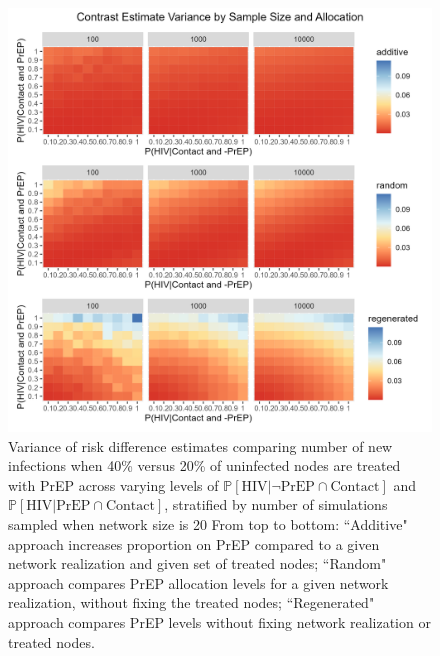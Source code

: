 \documentclass{article}
\theoremstyle{definition}
\begin{document}
\begin{figure}[H]
    \centering
    \includegraphics[width=\linewidth]{Figures/Sample Size Variance plots.png}
    \caption{Variance of risk difference estimates comparing number of new infections when 40\% versus 20\% of uninfected nodes are treated with PrEP across varying levels of $\mathbb{P}\left[\text{HIV} \vert \neg \text{PrEP} \cap \text{Contact}\right]$ and $\mathbb{P}\left[\text{HIV} \vert \text{PrEP} \cap \text{Contact}\right]$, stratified by number of simulations sampled when network size is 20 %
    From top to bottom: ``Additive" approach increases proportion on PrEP compared to a given network realization and given set of treated nodes; ``Random" approach compares PrEP allocation levels for a given network realization, without fixing the treated nodes; ``Regenerated" approach compares PrEP levels without fixing network realization or treated nodes. }
    \label{fig:Figure 9}
\end{figure}
\end{document}
